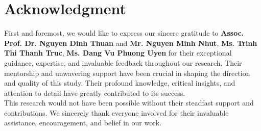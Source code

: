 \documentclass{ieeeojies}
\begin{document}
\section*{Acknowledgment}
First and foremost, we would like to express our sincere gratitude to \textbf{Assoc. Prof. Dr. Nguyen Dinh Thuan} and \textbf{Mr. Nguyen Minh Nhut},  \textbf{Ms. Trinh Thi Thanh Truc}, \textbf{Ms. Dang Vu Phuong Uyen} for their exceptional guidance, expertise, and invaluable feedback throughout our research. Their mentorship and unwavering support have been crucial in shaping the direction and quality of this study. Their profound knowledge, critical insights, and attention to detail have greatly contributed to its success.
\\This research would not have been possible without their steadfast support and contributions. We sincerely thank everyone involved for their invaluable assistance, encouragement, and belief in our work.
\end{document}
